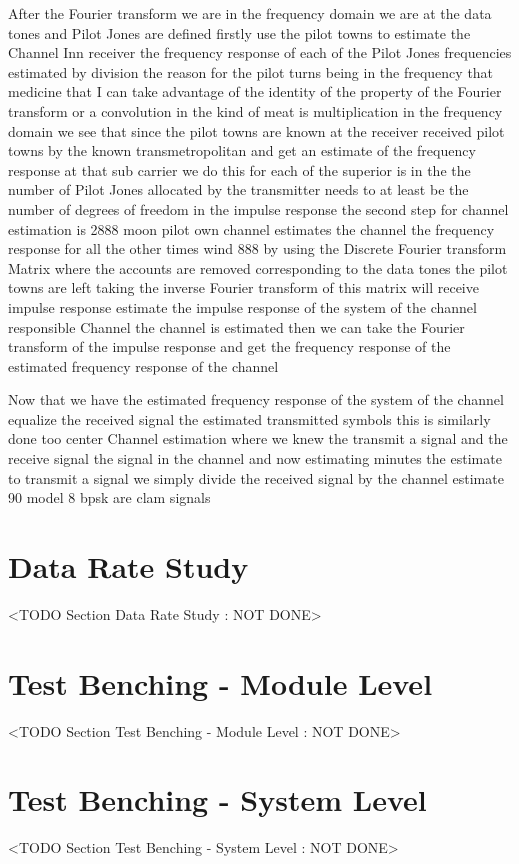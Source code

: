 After the Fourier transform we are in the frequency domain we are at the data tones and Pilot Jones are defined firstly use the pilot towns to estimate the Channel Inn receiver the frequency response of each of the Pilot Jones frequencies estimated by division the reason for the pilot turns being in the frequency that medicine that I can take advantage of the identity of the property of the Fourier transform or a convolution in the kind of meat is multiplication in the frequency domain we see that since the pilot towns are known at the receiver received pilot towns by the known transmetropolitan and get an estimate of the frequency response at that sub carrier we do this for each of the superior is in the the number of Pilot Jones allocated by the transmitter needs to at least be the number of degrees of freedom in the impulse response the second step for channel estimation is 2888 moon pilot own channel estimates the channel the frequency response for all the other times wind 888 by using the Discrete Fourier transform Matrix where the accounts are removed corresponding to the data tones the pilot towns are left taking the inverse Fourier transform of this matrix will receive impulse response estimate the impulse response of the system of the channel responsible Channel the channel is estimated then we can take the Fourier transform of the impulse response and get the frequency response of the estimated frequency response of the channel

Now that we have the estimated frequency response of the system of the channel equalize the received signal the estimated transmitted symbols this is similarly done too center Channel estimation where we knew the transmit a signal and the receive signal the signal in the channel and now estimating minutes the estimate to transmit a signal we simply divide the received signal by the channel estimate 90 model 8 bpsk are clam signals

\section{Data Rate Study}
	<TODO Section Data Rate Study : NOT DONE>
\section{Test Benching - Module Level}
	<TODO Section Test Benching - Module Level : NOT DONE>
\section{Test Benching - System Level}
	<TODO Section Test Benching - System Level : NOT DONE>
